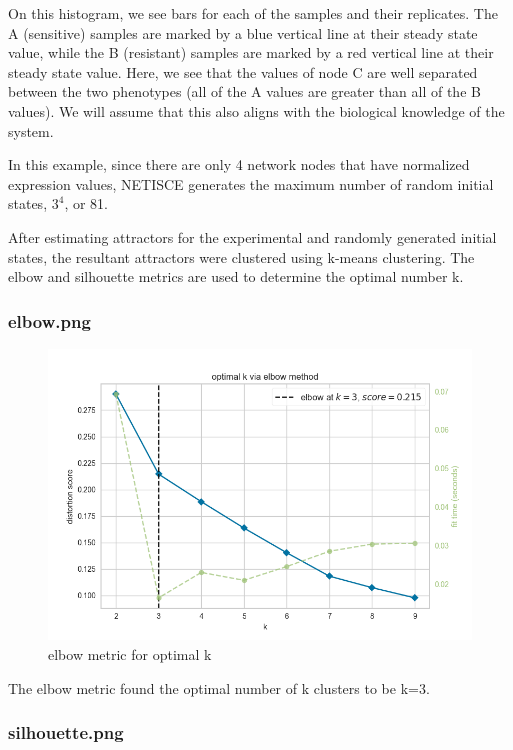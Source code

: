 \documentclass[
]{book}
\begin{document}
On this histogram, we see bars for each of the samples and their replicates. The A (sensitive) samples are marked by a blue vertical line at their steady state value, while the B (resistant) samples are marked by a red vertical line at their steady state value. Here, we see that the values of node C are well separated between the two phenotypes (all of the A values are greater than all of the B values). We will assume that this also aligns with the biological knowledge of the system.

In this example, since there are only 4 network nodes that have normalized expression values, NETISCE generates the maximum number of random initial states, \(3^4\), or 81.

After estimating attractors for the experimental and randomly generated initial states, the resultant attractors were clustered using k-means clustering. The elbow and silhouette metrics are used to determine the optimal number k.

\hypertarget{section-id}{%
\subsubsection*{elbow.png}\label{section-id}}

\begin{figure}

{\centering \includegraphics[width=0.5\linewidth]{results/elbow} 

}

\caption{elbow metric for optimal k}\label{fig:unnamed-chunk-11}
\end{figure}

The elbow metric found the optimal number of k clusters to be k=3.

\hypertarget{section-id}{%
\subsubsection*{silhouette.png}\label{section-id}}
\end{document}
